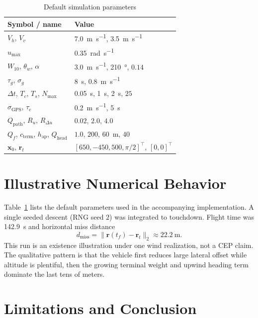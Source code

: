 \documentclass[conference]{IEEEtran}
\begin{document}
\begin{table}[t]
\centering
\caption{Default simulation parameters}
\label{tab:params}
\begin{tabular}{@{}ll@{}}
\toprule
Symbol / name & Value \\
\midrule
$V_h$, $V_v$ & \SI{7.0}{\meter\per\second}, \SI{3.5}{\meter\per\second} \\
$u_{\max}$ & \SI{0.35}{\radian\per\second} \\
$W_{10}$, $\theta_w$, $\alpha$ & \SI{3.0}{\meter\per\second}, \SI{210}{\degree}, $0.14$ \\
$\tau_g$, $\sigma_g$ & \SI{8}{\second}, \SI{0.8}{\meter\per\second} \\
$\Delta t$, $T_c$, $T_s$, $N_{\max}$ & \SI{0.05}{\second}, \SI{1}{\second}, \SI{2}{\second}, $25$ \\
$\sigma_{\mathrm{GPS}}$, $\tau_e$ & \SI{0.2}{\meter\per\second}, \SI{5}{\second} \\
$Q_{\mathrm{path}}$, $R_u$, $R_{\Delta u}$ & $0.02$, $2.0$, $4.0$ \\
$Q_f$, $c_{\mathrm{term}}$, $h_{\mathrm{ap}}$, $Q_{\mathrm{head}}$ & $1.0$, $200$, \SI{60}{\meter}, $40$ \\
$\mathbf{x}_0$, $\mathbf{r}_t$ & $[650,-450,500,\pi/2]^{\top}$, $[0,0]^{\top}$ \\
\bottomrule
\end{tabular}
\end{table}

\section{Illustrative Numerical Behavior}

Table~\ref{tab:params} lists the default parameters used in the accompanying implementation.
A single seeded descent (RNG seed $2$) was integrated to touchdown.
Flight time was \SI{142.9}{\second} and horizontal miss distance
\begin{equation}
d_{\mathrm{miss}}
=
\|\mathbf{r}(t_f)-\mathbf{r}_t\|_2
\approx
\SI{22.2}{\meter}.
\label{eq:miss}
\end{equation}
This run is an existence illustration under one wind realization, not a CEP claim.
The qualitative pattern is that the vehicle first reduces large lateral offset while altitude is plentiful, then the growing terminal weight and upwind heading term dominate the last tens of meters.

\section{Limitations and Conclusion}
\end{document}
